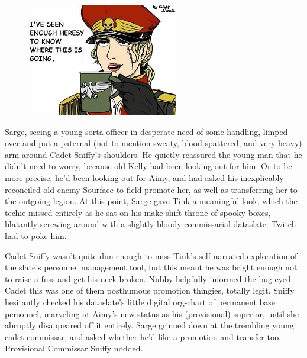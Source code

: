 \begin{figure}
	\begin{center}
		\includegraphics[width=\figwidth]{pics/21/116.png}
	\end{center}
\end{figure}
Sarge, seeing a young sorta-officer in desperate need of some handling, limped over and put a paternal (not to mention sweaty, blood-spattered, and very heavy) arm around Cadet Sniffy's shoulders. 
He quietly reassured the young man that he didn't need to worry, because old Kelly had been looking out for him. 
Or to be more precise, he'd been looking out for Aimy, and had asked his inexplicably reconciled old enemy Sourface to field-promote her, as well as transferring her to the outgoing legion. 
At this point, Sarge gave Tink a meaningful look, which the techie missed entirely as he sat on his make-shift throne of spooky-boxes, blatantly screwing around with a slightly bloody commissarial dataslate. 
Twitch had to poke him.

Cadet Sniffy wasn't quite dim enough to miss Tink's self-narrated exploration of the slate's personnel management tool, but this meant he was bright enough not to raise a fuss and get his neck broken. 
Nubby helpfully informed the bug-eyed Cadet this was one of them posthumous promotion thingies, totally legit. 
Sniffy hesitantly checked his dataslate's little digital org-chart of permanent base personnel, marveling at Aimy's new status as his (provisional) superior, until she abruptly disappeared off it entirely. 
Sarge grinned down at the trembling young cadet-commissar, and asked whether he'd like a promotion and transfer too. 
Provisional Commissar Sniffy nodded.

